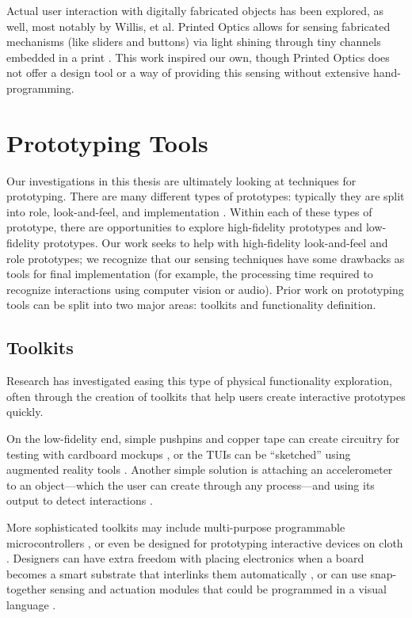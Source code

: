         Actual user interaction with digitally fabricated objects has been explored, as well, most notably by Willis, et al. Printed Optics allows for sensing fabricated mechanisms (like sliders and buttons) via light shining through tiny channels embedded in a print \cite{willis-printedoptics}. This work inspired our own, though Printed Optics does not offer a design tool or a way of providing this sensing without extensive hand-programming.

\section{Prototyping Tools}

    Our investigations in this thesis are ultimately looking at techniques for prototyping. There are many different types of prototypes: typically they are split into role, look-and-feel, and implementation \cite{houde-prototypes}. Within each of these types of prototype, there are opportunities to explore high-fidelity prototypes and low-fidelity prototypes. Our work seeks to help with high-fidelity look-and-feel and role prototypes; we recognize that our sensing techniques have some drawbacks as tools for final implementation (for example, the processing time required to recognize interactions using computer vision or audio). Prior work on prototyping tools can be split into two major areas: toolkits and functionality definition.

    \subsection{Toolkits}
    Research has investigated easing this type of physical functionality exploration, often through the creation of toolkits that help users create interactive prototypes quickly.
    
    On the low-fidelity end, simple pushpins and copper tape can create circuitry for testing with cardboard mockups \cite{hudson-boxes}, or the TUIs can be ``sketched'' using augmented reality tools \cite{nam-sketchingtuis}. Another simple solution is attaching an accelerometer to an object---which the user can create through any process---and using its output to detect interactions \cite{hook-making}.
    
    More sophisticated toolkits may include multi-purpose programmable microcontrollers \cite{arduino}, or even be designed for prototyping interactive devices on cloth \cite{buechley-lilypad}. Designers can have extra freedom with placing electronics when a board becomes a smart substrate that interlinks them automatically \cite{villar-voodooio}, or can use snap-together sensing and actuation modules \cite{avrahami-switcharoo, greenberg-phidgets, lee-calder} that could be programmed in a visual language \cite{villar-gadgeteer}.
    
